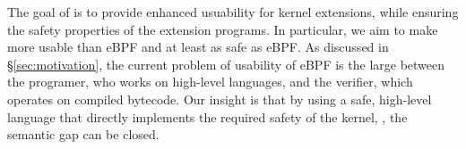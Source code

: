 
%


The goal of \projname{} is to provide enhanced usuability for kernel extensions,
    while ensuring the safety properties of the extension programs.
In particular, we aim to make \projname{} more usable than eBPF and at least
    as safe as eBPF.
As discussed in \S\ref{sec:motivation}, the current problem of usability of
    eBPF is the large \gap{} between the programer, who works on
    high-level languages, and the verifier, which operates on compiled bytecode.
Our insight is that by using a safe, high-level language that directly
    implements the required safety of the kernel, , the semantic gap can be
    closed.

